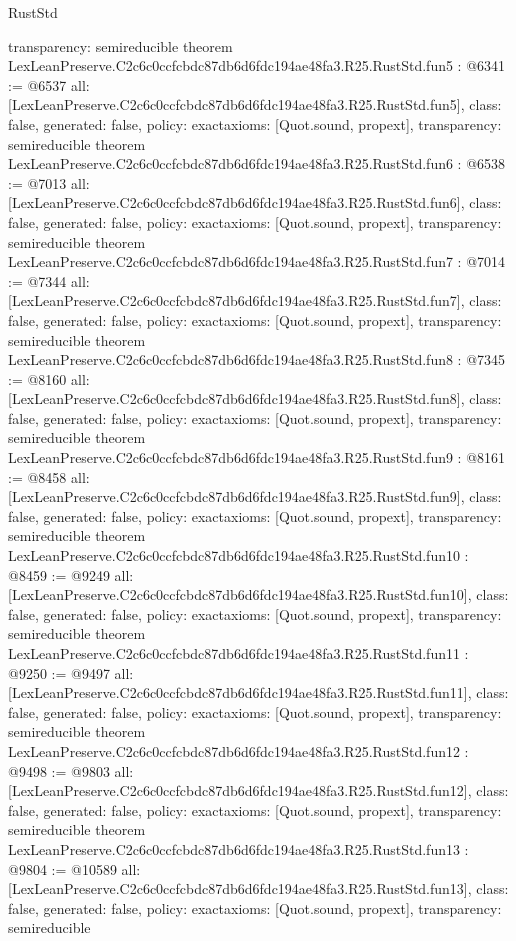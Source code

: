 \begin{lexlean}{RustStd}
\begin{coremodule}
{  transparency: semireducible
}
theorem LexLeanPreserve.C2c6c0ccfcbdc87db6d6fdc194ae48fa3.R25.RustStd.fun5 : @6341 := @6537 {
  all: [LexLeanPreserve.C2c6c0ccfcbdc87db6d6fdc194ae48fa3.R25.RustStd.fun5],
  class: false,
  generated: false,
  policy: exact{axioms: [Quot.sound, propext]},
  transparency: semireducible
}
theorem LexLeanPreserve.C2c6c0ccfcbdc87db6d6fdc194ae48fa3.R25.RustStd.fun6 : @6538 := @7013 {
  all: [LexLeanPreserve.C2c6c0ccfcbdc87db6d6fdc194ae48fa3.R25.RustStd.fun6],
  class: false,
  generated: false,
  policy: exact{axioms: [Quot.sound, propext]},
  transparency: semireducible
}
theorem LexLeanPreserve.C2c6c0ccfcbdc87db6d6fdc194ae48fa3.R25.RustStd.fun7 : @7014 := @7344 {
  all: [LexLeanPreserve.C2c6c0ccfcbdc87db6d6fdc194ae48fa3.R25.RustStd.fun7],
  class: false,
  generated: false,
  policy: exact{axioms: [Quot.sound, propext]},
  transparency: semireducible
}
theorem LexLeanPreserve.C2c6c0ccfcbdc87db6d6fdc194ae48fa3.R25.RustStd.fun8 : @7345 := @8160 {
  all: [LexLeanPreserve.C2c6c0ccfcbdc87db6d6fdc194ae48fa3.R25.RustStd.fun8],
  class: false,
  generated: false,
  policy: exact{axioms: [Quot.sound, propext]},
  transparency: semireducible
}
theorem LexLeanPreserve.C2c6c0ccfcbdc87db6d6fdc194ae48fa3.R25.RustStd.fun9 : @8161 := @8458 {
  all: [LexLeanPreserve.C2c6c0ccfcbdc87db6d6fdc194ae48fa3.R25.RustStd.fun9],
  class: false,
  generated: false,
  policy: exact{axioms: [Quot.sound, propext]},
  transparency: semireducible
}
theorem LexLeanPreserve.C2c6c0ccfcbdc87db6d6fdc194ae48fa3.R25.RustStd.fun10 : @8459 := @9249 {
  all: [LexLeanPreserve.C2c6c0ccfcbdc87db6d6fdc194ae48fa3.R25.RustStd.fun10],
  class: false,
  generated: false,
  policy: exact{axioms: [Quot.sound, propext]},
  transparency: semireducible
}
theorem LexLeanPreserve.C2c6c0ccfcbdc87db6d6fdc194ae48fa3.R25.RustStd.fun11 : @9250 := @9497 {
  all: [LexLeanPreserve.C2c6c0ccfcbdc87db6d6fdc194ae48fa3.R25.RustStd.fun11],
  class: false,
  generated: false,
  policy: exact{axioms: [Quot.sound, propext]},
  transparency: semireducible
}
theorem LexLeanPreserve.C2c6c0ccfcbdc87db6d6fdc194ae48fa3.R25.RustStd.fun12 : @9498 := @9803 {
  all: [LexLeanPreserve.C2c6c0ccfcbdc87db6d6fdc194ae48fa3.R25.RustStd.fun12],
  class: false,
  generated: false,
  policy: exact{axioms: [Quot.sound, propext]},
  transparency: semireducible
}
theorem LexLeanPreserve.C2c6c0ccfcbdc87db6d6fdc194ae48fa3.R25.RustStd.fun13 : @9804 := @10589 {
  all: [LexLeanPreserve.C2c6c0ccfcbdc87db6d6fdc194ae48fa3.R25.RustStd.fun13],
  class: false,
  generated: false,
  policy: exact{axioms: [Quot.sound, propext]},
  transparency: semireducible
}
\end{coremodule}
\end{lexlean}

